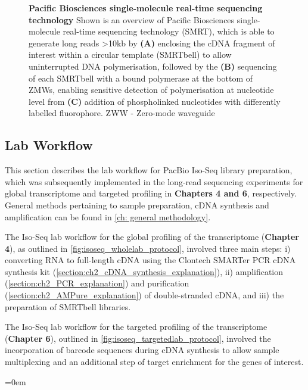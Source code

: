 \begin{figure}[!h]
	\captionsetup{width=0.95\textwidth}
	\caption[Pacific Biosciences single-molecule real-time sequencing technology]%
	{\textbf{Pacific Biosciences single-molecule real-time sequencing technology} Shown is an overview of Pacific Biosciences single-molecule real-time sequencing technology (SMRT), which is able to generate long reads >10kb by \textbf{(A)} enclosing the cDNA fragment of interest within a circular template (SMRTbell) to allow uninterrupted DNA polymerisation,  followed by the \textbf{(B)} sequencing of each SMRTbell with a bound polymerase at the bottom of ZMWs, enabling sensitive detection of polymerisation at nucleotide level from \textbf{(C)} addition of phospholinked nucleotides with differently labelled fluorophore. ZWW - Zero-mode waveguide}
	\label{fig:Mechanism}
\end{figure}

\clearpage
\subsection{Lab Workflow}
\label{chap:isoseq_labpipeline}
This section describes the lab workflow for PacBio Iso-Seq library preparation, which was subsequently implemented in the long-read sequencing experiments for global transcriptome and targeted profiling in \textbf{Chapters 4 and 6}, respectively. General methods pertaining to sample preparation, cDNA synthesis and amplification can be found in \cref{ch: general methodology}.

The Iso-Seq lab workflow for the global profiling of the transcriptome (\textbf{Chapter 4}), as outlined in \cref{fig:isoseq_wholelab_protocol}, involved three main steps: i) converting RNA to full-length cDNA using the Clontech SMARTer PCR cDNA synthesis kit (\cref{section:ch2_cDNA_synthesis_explanation}), ii) amplification (\cref{section:ch2_PCR_explanation}) and purification (\cref{section:ch2_AMPure_explanation}) of double-stranded cDNA, and iii) the preparation of SMRTbell libraries. 

The Iso-Seq lab workflow for the targeted profiling of the transcriptome (\textbf{Chapter 6}), outlined in \cref{fig:isoseq_targetedlab_protocol}, involved the incorporation of barcode sequences during cDNA synthesis to allow sample multiplexing and an additional step of target enrichment for the genes of interest.

\vspace{3cm}
\begingroup
\parindent=0em
\localtableofcontents 
\endgroup

